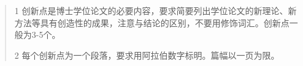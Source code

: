 

\begin{abstract}

1 创新点是博士学位论文的必要内容，要求简要列出学位论文的新理论、新方法等具有创造性的成果，注意与结论的区别，不要用修饰词汇。创新点一般为3-5个。

2 每个创新点为一个段落，要求用阿拉伯数字标明。篇幅以一页为限。

\end{abstract}%
